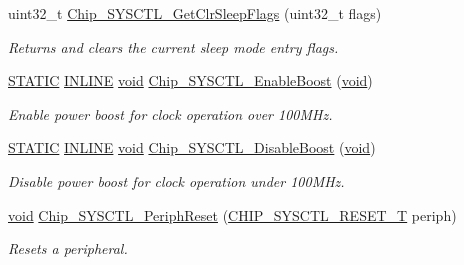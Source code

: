 \begin{DoxyCompactItemize}
uint32\-\_\-t \hyperlink{group__SYSCTL__17XX__40XX_gab80482c3d12f51ef87131497cb67a326}{Chip\-\_\-\-S\-Y\-S\-C\-T\-L\-\_\-\-Get\-Clr\-Sleep\-Flags} (uint32\-\_\-t flags)
\begin{DoxyCompactList}\small\item\em Returns and clears the current sleep mode entry flags. \end{DoxyCompactList}\item 
\hyperlink{group__LPC__Types__Public__Macros_ga10b2d890d871e1489bb02b7e70d9bdfb}{S\-T\-A\-T\-I\-C} \hyperlink{group__LPC__Types__Public__Types_ga2eb6f9e0395b47b8d5e3eeae4fe0c116}{I\-N\-L\-I\-N\-E} \hyperlink{Paradigm_2Tern__EE_2small_2portmacro_8h_a14d32f8130d3c0b212cfc751730b5b49}{void} \hyperlink{group__SYSCTL__17XX__40XX_gaaf987cc6cf1398ae226aaebb975a6372}{Chip\-\_\-\-S\-Y\-S\-C\-T\-L\-\_\-\-Enable\-Boost} (\hyperlink{Paradigm_2Tern__EE_2small_2portmacro_8h_a14d32f8130d3c0b212cfc751730b5b49}{void})
\begin{DoxyCompactList}\small\item\em Enable power boost for clock operation over 100\-M\-Hz. \end{DoxyCompactList}\item 
\hyperlink{group__LPC__Types__Public__Macros_ga10b2d890d871e1489bb02b7e70d9bdfb}{S\-T\-A\-T\-I\-C} \hyperlink{group__LPC__Types__Public__Types_ga2eb6f9e0395b47b8d5e3eeae4fe0c116}{I\-N\-L\-I\-N\-E} \hyperlink{Paradigm_2Tern__EE_2small_2portmacro_8h_a14d32f8130d3c0b212cfc751730b5b49}{void} \hyperlink{group__SYSCTL__17XX__40XX_ga3c49515056cbc9af430e33f9d8401487}{Chip\-\_\-\-S\-Y\-S\-C\-T\-L\-\_\-\-Disable\-Boost} (\hyperlink{Paradigm_2Tern__EE_2small_2portmacro_8h_a14d32f8130d3c0b212cfc751730b5b49}{void})
\begin{DoxyCompactList}\small\item\em Disable power boost for clock operation under 100\-M\-Hz. \end{DoxyCompactList}\item 
\hyperlink{Paradigm_2Tern__EE_2small_2portmacro_8h_a14d32f8130d3c0b212cfc751730b5b49}{void} \hyperlink{group__SYSCTL__17XX__40XX_ga94ee3796eba43742e11809eacb88269b}{Chip\-\_\-\-S\-Y\-S\-C\-T\-L\-\_\-\-Periph\-Reset} (\hyperlink{group__SYSCTL__17XX__40XX_gaecf57441c240b2e654da2a7de6da0f7b}{C\-H\-I\-P\-\_\-\-S\-Y\-S\-C\-T\-L\-\_\-\-R\-E\-S\-E\-T\-\_\-\-T} periph)
\begin{DoxyCompactList}\small\item\em Resets a peripheral. \end{DoxyCompactList}\end{DoxyCompactItemize}


